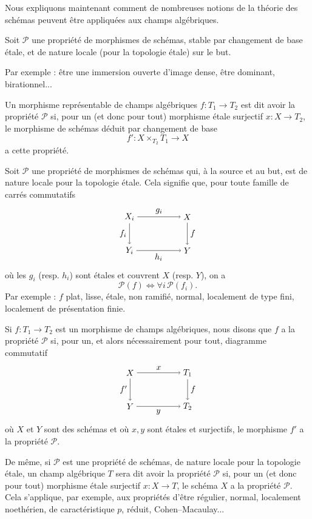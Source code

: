 \documentclass[10pt]{article}
\begin{document}
Nous expliquons maintenant comment de nombreuses notions de la théorie des schémas peuvent être appliquées aux champs algébriques.

Soit $\mathcal P$ une propriété de morphismes de schémas, stable par changement de base étale, et de nature locale (pour la topologie étale) sur le but.

Par exemple : être une immersion ouverte d'image dense, être dominant, birationnel...

Un morphisme représentable de champs algébriques $f:T_1\to T_2$ est dit avoir la propriété $\mathcal P$ si, pour un (et donc pour tout) morphisme étale surjectif $x:X\to T_2$, le morphisme de schémas déduit par changement de base
\[
f':X\times_{T_2}T_1\longrightarrow X
\]
a cette propriété.

Soit $\mathcal P$ une propriété de morphismes de schémas qui, à la source et au but, est de nature locale pour la topologie étale. Cela signifie que, pour toute famille de carrés commutatifs
\[
\begin{tikzpicture}[baseline=(current bounding box.center), node distance=1.6cm]
\node (Xi) at (0,1.4) {$X_i$};
\node (X) at (2.4,1.4) {$X$};
\node (Yi) at (0,0) {$Y_i$};
\node (Y) at (2.4,0) {$Y$};
\draw[->] (Xi) -- node[above] {$g_i$} (X);
\draw[->] (Xi) -- node[left] {$f_i$} (Yi);
\draw[->] (X) -- node[right] {$f$} (Y);
\draw[->] (Yi) -- node[below] {$h_i$} (Y);
\end{tikzpicture}
\]
où les $g_i$ (resp. $h_i$) sont étales et couvrent $X$ (resp. $Y$), on a
\[
\mathcal P(f)\Longleftrightarrow \forall i\,\mathcal P(f_i).
\]
Par exemple : $f$ plat, lisse, étale, non ramifié, normal, localement de type fini, localement de présentation finie.

Si $f:T_1\to T_2$ est un morphisme de champs algébriques, nous disons que $f$ a la propriété $\mathcal P$ si, pour un, et alors nécessairement pour tout, diagramme commutatif
\[
\begin{tikzpicture}[baseline=(current bounding box.center)]
\node (X) at (0,1.4) {$X$};
\node (T1) at (2.4,1.4) {$T_1$};
\node (Y) at (0,0) {$Y$};
\node (T2) at (2.4,0) {$T_2$};
\draw[->] (X) -- node[above] {$x$} (T1);
\draw[->] (X) -- node[left] {$f'$} (Y);
\draw[->] (T1) -- node[right] {$f$} (T2);
\draw[->] (Y) -- node[below] {$y$} (T2);
\end{tikzpicture}
\]
où $X$ et $Y$ sont des schémas et où $x,y$ sont étales et surjectifs, le morphisme $f'$ a la propriété $\mathcal P$.

De même, si $\mathcal P$ est une propriété de schémas, de nature locale pour la topologie étale, un champ algébrique $T$ sera dit avoir la propriété $\mathcal P$ si, pour un (et donc pour tout) morphisme étale surjectif $x:X\to T$, le schéma $X$ a la propriété $\mathcal P$. Cela s'applique, par exemple, aux propriétés d'être régulier, normal, localement noethérien, de caractéristique $p$, réduit, Cohen--Macaulay...
\end{document}
